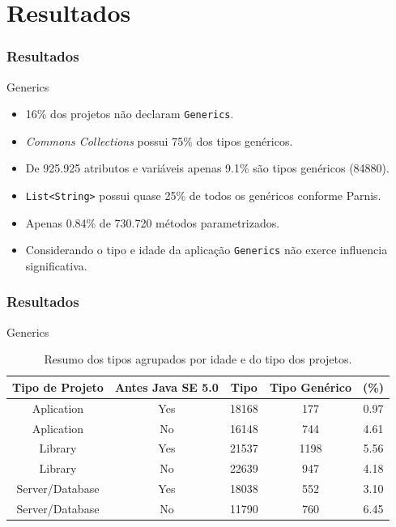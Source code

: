 \documentclass[]{beamer}
\begin{document}
	
	

	\section{Resultados}
	
	\begin{frame}[fragile, label=re]\frametitle{Resultados}
		\begin{block}{Generics}
			\begin{itemize}
				\item 16\% dos projetos não declaram \texttt{Generics}.
				
				\item \textit{Commons Collections} possui 75\% dos tipos genéricos.
				
				\item De 925.925 atributos e variáveis apenas 9.1\% são tipos genéricos (84880).
				
				\item \texttt{List<String>} possui quase 25\% de todos os genéricos conforme Parnis.
				
				\item Apenas 0.84\% de 730.720 métodos parametrizados.
				
				\item Considerando o tipo e idade da aplicação \texttt{Generics} não exerce influencia significativa.
				
			\end{itemize}
		\end{block}
	\end{frame}

	\begin{frame}[fragile, label=re]\frametitle{Resultados}
		\begin{block}{Generics}
				\begin{table}[h!]\footnotesize
					\centering
					\caption{Resumo dos tipos agrupados por idade e do tipo dos projetos.}
					\begin{tabular}{ccccc} \hline 
						Tipo de Projeto & Antes Java SE 5.0 & Tipo & Tipo Genérico & (\%) \\ \hline\hline
						Aplication & Yes & 18168 & 177 & 0.97 \\
						Aplication & No & 16148 & 744 & 4.61 \\
						Library & Yes & 21537 & 1198 & 5.56 \\
						Library & No & 22639 & 947 & 4.18 \\
						Server/Database & Yes & 18038 & 552 & 3.10 \\ 
						Server/Database & No & 11790 & 760 & 6.45 \\ \hline
					\end{tabular}
					\label{tab:std} %
				\end{table}
	
			\end{block}
		\end{frame}
		
\end{document}

